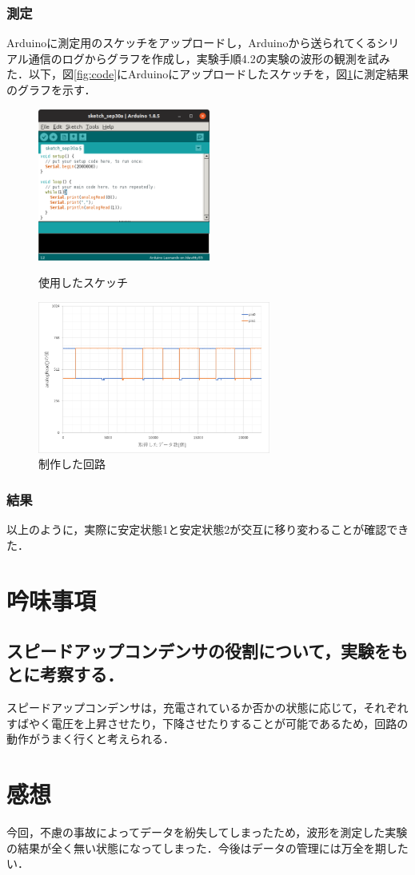 \documentclass[10pt, a4j, dvipdfmx]{jarticle}
\begin{document}
    \subsubsection{測定}
    Arduinoに測定用のスケッチをアップロードし，Arduinoから送られてくるシリアル通信のログからグラフを作成し，実験手順4.2の実験の波形の観測を試みた．以下，図\ref{fig:code}にArduinoにアップロードしたスケッチを，図\ref{fig:ex-ex-1}に測定結果のグラフを示す．
    \begin{figure}[H]
        \begin{minipage}{0.5\hsize}
            \centering
            \includegraphics[height=50mm]{images/code.png}
            \caption{使用したスケッチ}
            \label{fig:code}
        \end{minipage}
        \begin{minipage}{0.5\hsize}
            \centering
            \includegraphics[height=50mm]{images/ex-ex-1.png}
            \caption{制作した回路}
            \label{fig:ex-ex-1}
        \end{minipage}
    \end{figure}
    \subsubsection{結果}
    以上のように，実際に安定状態1と安定状態2が交互に移り変わることが確認できた．

    \section{吟味事項}
    \subsection{スピードアップコンデンサの役割について，実験をもとに考察する．}
    スピードアップコンデンサは，充電されているか否かの状態に応じて，それぞれすばやく電圧を上昇させたり，下降させたりすることが可能であるため，回路の動作がうまく行くと考えられる．

    \section{感想}
    今回，不慮の事故によってデータを紛失してしまったため，波形を測定した実験の結果が全く無い状態になってしまった．今後はデータの管理には万全を期したい．
\end{document}
